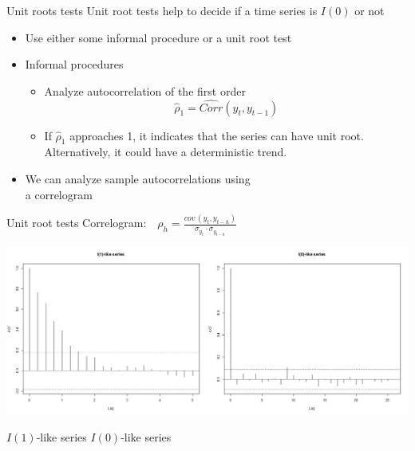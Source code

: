 \documentclass[usenames,dvipsnames]{beamer}
\begin{document}

\begin{frame}{Unit roots tests}
Unit root tests help to decide if a time series is $I(0)$ or not
\vspace{0.4cm}
\begin{itemize}
\item Use either some informal procedure or a unit root test
\vspace{0.4cm}
\item Informal procedures
\begin{itemize}
\item Analyze autocorrelation of the first order
$$\hat{\rho}_1=\hat{Corr}(y_t,y_{t-1})$$
\item If $\hat{\rho}_1$ approaches 1, it indicates that the series can have unit root. Alternatively, it could have a deterministic trend.
\end{itemize}
\item We can analyze sample autocorrelations using \\a correlogram
\end{itemize}
\end{frame}
\begin{frame}{Unit root tests}
Correlogram:  
$\, \, \, \, \rho_h = \frac{\textit{cov} \, (y_t, y_{t-h})}{\sigma_{y_t} \cdot \sigma_{y_{t-h}}}$

\includegraphics[width=1\textwidth]{img/corelogramWeek2.jpg}

\hspace{1.5cm} $I(1)$-like series \hspace{3 cm} $I(0)$-like series
\end{frame}
\end{document}
